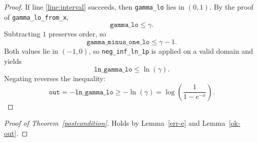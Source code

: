 \documentclass{article}
\begin{document}
\begin{proof}
If line \ref{line:interval} succeeds, then \texttt{gamma\_lo} lies in $(0,1)$.
By the proof of \texttt{gamma\_lo\_from\_x},
\[
\texttt{gamma\_lo} \le \gamma.
\]
Subtracting $1$ preserves order, so
\[
\texttt{gamma\_minus\_one\_lo} \le \gamma - 1.
\]
Both values lie in $(-1,0)$, so \texttt{neg\_inf\_ln\_1p} is applied on a valid domain and yields
\[
\texttt{ln\_gamma\_lo} \le \ln(\gamma).
\]
Negating reverses the inequality:
\[
\texttt{out} = -\texttt{ln\_gamma\_lo} \ge -\ln(\gamma)
= \log\!\left(\frac{1}{1 - e^{-x}}\right).
\]
\end{proof}

\begin{proof}[Proof of Theorem~\ref{postcondition}]
Holds by Lemma~\ref{err-e} and Lemma~\ref{ok-out}.
\end{proof}
\end{document}

